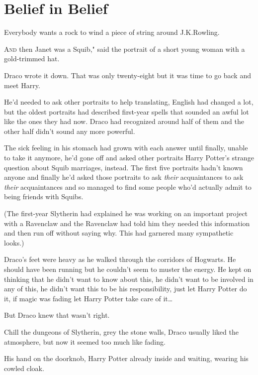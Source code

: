 \chapter{Belief in Belief}

\begin{chapterOpeningAuthorNote}
Everybody wants a rock to wind a piece of string around J.\?K.\?Rowling.
\end{chapterOpeningAuthorNote}

\lettrine[ante=``]{A}{nd} then Janet was a Squib," said the portrait of a short young woman with a gold-trimmed hat.

Draco wrote it down. That was only twenty-eight but it was time to go back and meet Harry.

He'd needed to ask other portraits to help translating, English had changed a lot, but the oldest portraits had described first-year spells that sounded an awful lot like the ones they had now. Draco had recognized around half of them and the other half didn't sound any more powerful.

The sick feeling in his stomach had grown with each answer until finally, unable to take it anymore, he'd gone off and asked other portraits Harry Potter's strange question about Squib marriages, instead. The first five portraits hadn't known anyone and finally he'd asked those portraits to ask \emph{their} acquaintances to ask \emph{their} acquaintances and so managed to find some people who'd actually admit to being friends with Squibs.

(The first-year Slytherin had explained he was working on an important project with a Ravenclaw and the Ravenclaw had told him they needed this information and then run off without saying why. This had garnered many sympathetic looks.)

Draco's feet were heavy as he walked through the corridors of Hogwarts. He should have been running but he couldn't seem to muster the energy. He kept on thinking that he didn't want to know about this, he didn't want to be involved in any of this, he didn't want this to be his responsibility, just let Harry Potter do it, if magic was fading let Harry Potter take care of it{\ldots}

But Draco knew that wasn't right.

Chill the dungeons of Slytherin, grey the stone walls, Draco usually liked the atmosphere, but now it seemed too much like fading.

His hand on the doorknob, Harry Potter already inside and waiting, wearing his cowled cloak.


